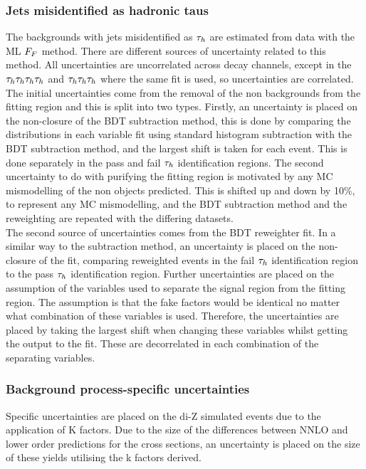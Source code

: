 \subsubsection{Jets misidentified as hadronic taus}
The backgrounds with jets misidentified as $\tau_{h}$ are estimated from data with the \ac{ML} $F_{F}$ method. 
There are different sources of uncertainty related to this method. 
All uncertainties are uncorrelated across decay channels, except in the $\tau_{h}\tau_{h}\tau_{h}\tau_{h}$ and $\tau_{h}\tau_{h}\tau_{h}$ where the same fit is used, so uncertainties are correlated. \\

The initial uncertainties come from the removal of the non \jtth backgrounds from the fitting region and this is split into two types.
Firstly, an uncertainty is placed on the non-closure of the \ac{BDT} subtraction method, this is done by comparing the distributions in each variable fit using standard histogram subtraction with the \ac{BDT} subtraction method, and the largest shift is taken for each event. This is done separately in the pass and fail $\tau_{h}$ identification regions.
The second uncertainty to do with purifying the fitting region is motivated by any \ac{MC} mismodelling of the non \jtth objects predicted.
This is shifted up and down by 10\%, to represent any \ac{MC} mismodelling, and the \ac{BDT} subtraction method and the reweighting are repeated with the differing datasets. \\

The second source of uncertainties comes from the \ac{BDT} reweighter fit.
In a similar way to the subtraction method, an uncertainty is placed on the non-closure of the fit, comparing reweighted events in the fail $\tau_{h}$ identification region to the pass $\tau_{h}$ identification region.
Further uncertainties are placed on the assumption of the variables used to separate the signal region from the fitting region.
The assumption is that the fake factors would be identical no matter what combination of these variables is used.
Therefore, the uncertainties are placed by taking the largest shift when changing these variables whilst getting the output to the fit.
These are decorrelated in each combination of the separating variables.

\subsubsection{Background process-specific uncertainties}
Specific uncertainties are placed on the di-Z simulated events due to the application of K factors.
Due to the size of the differences between \ac{NNLO} and lower order predictions for the cross sections, an uncertainty is placed on the size of these yields utilising the k factors derived.

